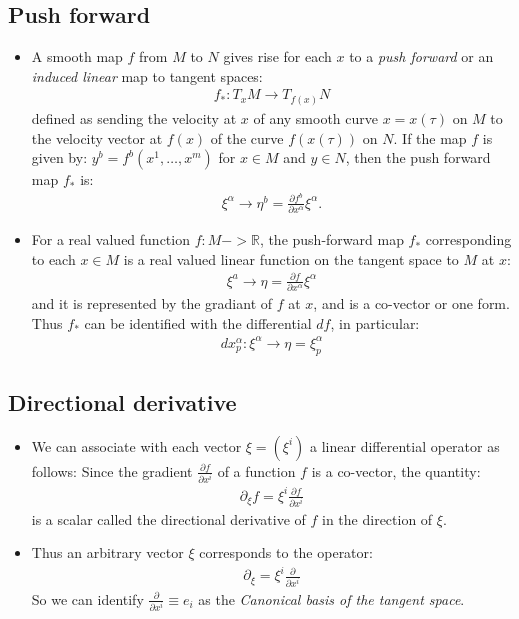 \documentclass[11pt]{article}
\numberwithin{equation}{section}
\DeclareRobustCommand{\RR}{\mathbb{R}}
\begin{document}
\subsection{Push forward}
\begin{itemize}
  \item A smooth map $f$ from $M$ to $N$ gives rise for each $x$ to a \emph{push forward} or an \emph{induced linear} map to tangent spaces:
  \begin{align*}
      f_{\ast}: T_{x}M \rightarrow T_{f(x)}N
    \end{align*}  
    defined as sending the velocity at $x$ of any smooth curve $x =x(\tau)$ on $M$ to the velocity vector at $f(x)$ of the curve $f(x(\tau))$ on $N$. If the map $f$ is given by: $y^b = f^b(x^{1},\ldots,x^m)$ for $x \in M$ and $y \in N$, then the push forward map $f_{\ast}$ is:
    \begin{align*}
      \xi^{\alpha} \rightarrow \eta^{b} = \frac{\partial f^{b}}{\partial x^{\alpha}}\xi^{\alpha}. 
    \end{align*}

    \item For a real valued function $f: M -> \RR$, the push-forward map $f_{\ast}$ corresponding to each $x\in M$ is a real valued linear function on the tangent space to $M$ at $x$: 
    \begin{align*}
      \xi^{a} \rightarrow \eta = \frac{\partial f}{\partial x^{\alpha}}\xi^{\alpha}
    \end{align*}
    and it is represented by the gradiant of $f$ at $x$, and is a co-vector or one form. Thus $f_{\ast}$ can be identified with the differential $df$, in particular:
    \begin{align*}
      dx^{\alpha}_{p}: \xi^{\alpha}\rightarrow\eta =\xi^{\alpha}_{p}
    \end{align*}
\end{itemize}

\subsection{Directional derivative}
\begin{itemize}
  \item We can associate with each vector $\xi = (\xi^{i})$ a linear differential operator as follows: Since the gradient $\frac{\partial f}{\partial x^i}$ of a function $f$ is a co-vector, the quantity:
  \begin{align*}
    \partial_{\xi}f = \xi^{i}\frac{\partial f}{\partial x^{i}}
  \end{align*}
  is a scalar called the directional derivative of $f$ in the direction of $\xi$. 

  \item Thus an arbitrary vector $\xi$ corresponds to the operator:
  \begin{align*}
    \partial_{\xi} = \xi^{i}\frac{\partial }{\partial x^i}
  \end{align*}
  So we can identify $\frac{\partial}{\partial x^i}\equiv e_{i}$ as the \emph{Canonical basis of the tangent space}. 
\end{itemize} 
\end{document}
